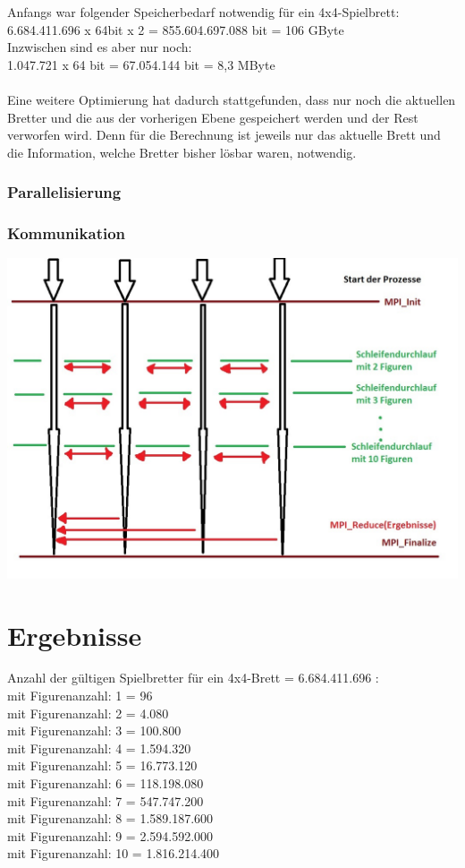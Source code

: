 \documentclass[
	12pt,
	a4paper,
	BCOR10mm,
	DIV14,
	listof=totoc,
	bibliography=totoc,
	headsepline
]{scrreprt}
\begin{document}
Anfangs war folgender Speicherbedarf notwendig für ein 4x4-Spielbrett:\\
6.684.411.696 x 64bit x 2 = 855.604.697.088 bit = 106 GByte \\
Inzwischen sind es aber nur noch: \\
1.047.721 x 64 bit = 67.054.144 bit = 8,3 MByte\\
\\ 
Eine weitere Optimierung hat dadurch stattgefunden, dass nur noch die aktuellen Bretter und die aus der vorherigen Ebene gespeichert werden und der Rest verworfen wird. Denn für die Berechnung ist jeweils nur das aktuelle Brett und die Information, welche Bretter bisher lösbar waren, notwendig.

\subsection{Parallelisierung}
\subsection{Kommunikation}
\includegraphics[scale=0.6]{MPI_Kommunikation}


\chapter{Ergebnisse}
\label{Ergebnisse}

Anzahl der gültigen Spielbretter für ein 4x4-Brett = 6.684.411.696 :\\
mit Figurenanzahl:  1 =         96 \\
mit Figurenanzahl:  2 =       4.080 \\
mit Figurenanzahl:  3 =     100.800 \\
mit Figurenanzahl:  4 =    1.594.320 \\
mit Figurenanzahl:  5 =   16.773.120 \\
mit Figurenanzahl:  6 =  118.198.080 \\
mit Figurenanzahl:  7 =  547.747.200 \\
mit Figurenanzahl:  8 = 1.589.187.600 \\
mit Figurenanzahl:  9 = 2.594.592.000 \\
mit Figurenanzahl: 10 = 1.816.214.400 \\
\end{document}
